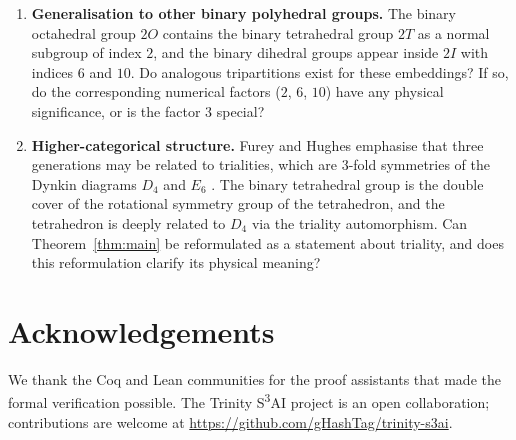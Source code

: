 \documentclass[10pt,reqno]{amsart}
\theoremstyle{plain}
\theoremstyle{definition}
\begin{document}
\begin{enumerate}
\item \textbf{Generalisation to other binary polyhedral groups.} The binary octahedral group $2O$ contains the binary tetrahedral group $2T$ as a normal subgroup of index $2$, and the binary dihedral groups appear inside $2I$ with indices $6$ and $10$. Do analogous tripartitions exist for these embeddings? If so, do the corresponding numerical factors ($2$, $6$, $10$) have any physical significance, or is the factor $3$ special?

\item \textbf{Higher-categorical structure.} Furey and Hughes emphasise that three generations may be related to trialities, which are $3$-fold symmetries of the Dynkin diagrams $D_4$ and $E_6$ \cite{FureyHughes2024}. The binary tetrahedral group is the double cover of the rotational symmetry group of the tetrahedron, and the tetrahedron is deeply related to $D_4$ via the triality automorphism. Can Theorem~\ref{thm:main} be reformulated as a statement about triality, and does this reformulation clarify its physical meaning?
\end{enumerate}

\section*{Acknowledgements}

We thank the Coq and Lean communities for the proof assistants that made the formal verification possible. The Trinity S\textsuperscript{3}AI project is an open collaboration; contributions are welcome at \url{https://github.com/gHashTag/trinity-s3ai}.
\end{document}
